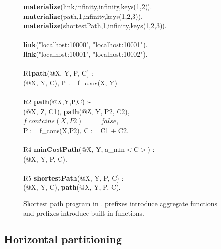 \begin{figure*}
\ssp
\begin{boxedminipage}{\linewidth}
{\bf materialize}(link,infinity,infinity,keys(1,2)). \\
{\bf materialize}(path,1,infinity,keys(1,2,3)).  \\
{\bf materialize}(shortestPath,1,infinity,keys(1,2,3)). \\
\\
{\bf link}("localhost:10000", "localhost:10001"). \\
{\bf link}("localhost:10001", "localhost:10002"). \\
\\
R1{\bf path}(@X, Y, P, C) :- \\
(@X, Y, C), P := f\_cons(X, Y). \\
\\       
R2 {\bf path}(@X,Y,P,C) :- \\
(@X, Z, C1), {\bf path}(@Z, Y, P2, C2), \\
\datalogspace $f\_contains(X,P2) == false$, \\
\datalogspace P := f\_cons(X,P2), C := C1 + C2. \\ 
\\      
R4 {\bf minCostPath}(@X, Y, a\_min$<$C$>$) :-  \\
(@X, Y, P, C). \\
\\
R5 {\bf shortestPath}(@X, Y, P, C) :- \\
(@X, Y, C), {\bf path}(@X, Y, P, C).\\
\end{boxedminipage}
\caption{\label{ch:p2:fig:overlogSP}Shortest path program in \OVERLOG. 
prefixes introduce aggregate functions and  prefixes introduce
built-in functions.}
\end{figure*}

\subsection{Horizontal partitioning}


